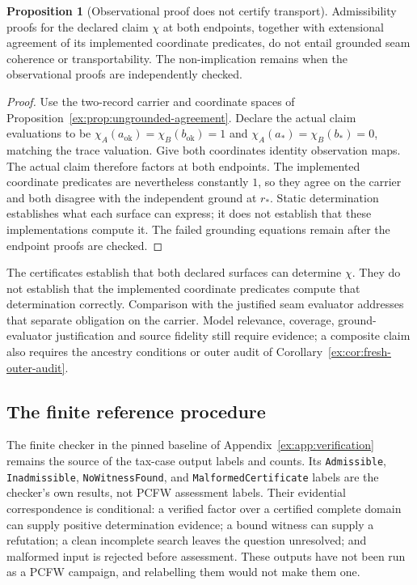 \documentclass[11pt]{article}
\theoremstyle{definition}
\newtheorem{proposition}{Proposition}[section]
\newcommand{\code}[1]{\texttt{#1}}
\begin{document}
\begin{proposition}[Observational proof does not certify transport]\label{ex:prop:observation-not-transport}
Admissibility proofs for the declared claim $\chi$ at both endpoints, together with extensional agreement of its implemented coordinate predicates, do not entail grounded seam coherence or transportability. The non-implication remains when the observational proofs are independently checked.
\end{proposition}
\begin{proof}
Use the two-record carrier and coordinate spaces of Proposition~\ref{ex:prop:ungrounded-agreement}. Declare the actual claim evaluations to be $\chi_A(a_{\mathrm{ok}})=\chi_B(b_{\mathrm{ok}})=1$ and $\chi_A(a_*)=\chi_B(b_*)=0$, matching the trace valuation. Give both coordinates identity observation maps. The actual claim therefore factors at both endpoints. The implemented coordinate predicates are nevertheless constantly $1$, so they agree on the carrier and both disagree with the independent ground at $r_*$. Static determination establishes what each surface can express; it does not establish that these implementations compute it. The failed grounding equations remain after the endpoint proofs are checked.
\end{proof}

The certificates establish that both declared surfaces can determine $\chi$. They do not establish that the implemented coordinate predicates compute that determination correctly. Comparison with the justified seam evaluator addresses that separate obligation on the carrier. Model relevance, coverage, ground-evaluator justification and source fidelity still require evidence; a composite claim also requires the ancestry conditions or outer audit of Corollary~\ref{ex:cor:fresh-outer-audit}.

\subsection{The finite reference procedure}\label{ex:sec:finite-procedure}

The finite checker in the pinned baseline of Appendix~\ref{ex:app:verification} remains the source of the tax-case output labels and counts. Its \code{Admissible}, \code{Inadmissible}, \code{NoWitnessFound}, and \code{MalformedCertificate} labels are the checker's own results, not PCFW assessment labels. Their evidential correspondence is conditional: a verified factor over a certified complete domain can supply positive determination evidence; a bound witness can supply a refutation; a clean incomplete search leaves the question unresolved; and malformed input is rejected before assessment. These outputs have not been run as a PCFW campaign, and relabelling them would not make them one.
\end{document}
